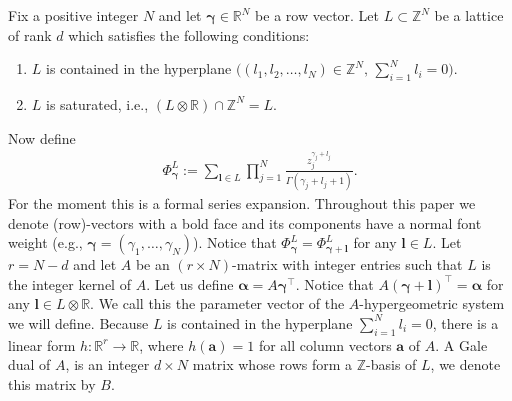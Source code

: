 \documentclass[11pt]{article}
\numberwithin{equation}{section}
\numberwithin{equation}{section}
\begin{document}
Fix a positive integer $N$ and let $\bm{\gamma}\in\mathbb{R}^N$ be a row vector. Let $L\subset\mathbb{Z}^N$ be a lattice of
rank $d$ which satisfies the following conditions:
\begin{enumerate}\itemsep=0pt
\item $L$ is contained in the hyperplane $\big((l_1,l_2,\dots,l_N) \in \mathbb{Z}^N, \, \sum_{i=1}^Nl_i=0\big)$.
\item $L$ is saturated, i.e., $(L\otimes\mathbb{R})\cap\mathbb{Z}^N=L$.
\end{enumerate}
Now define
\begin{gather*}
\Phi_{\bm{\gamma}}^L:=\sum_{\bm{l}\in L}\prod_{j=1}^N\frac{z_j^{\gamma_j+l_j}}
{\Gamma(\gamma_j+l_j+1)}.
\end{gather*}
For the moment this is a formal series expansion. Throughout this paper we denote (row)-vectors with a bold face and its components have a normal font weight (e.g., $\bm{\gamma} = (\gamma_1,\dots,\gamma_N )$).
Notice that $\Phi_{\bm{\gamma}}^L
=\Phi_{\bm{\gamma}+\bm{l}}^L$ for any $\bm{l}\in L$.
Let $r = N-d$ and let $A$ be an $(r \times N)$-matrix with integer entries such that $L$ is
the integer kernel of $A$.
Let us define
$\bm{\alpha}=A\bm{\gamma}^\intercal$. Notice that $A(\bm{\gamma}+\bm{l})^\intercal
=\bm{\alpha}$ for any $\bm{l}\in L\otimes\mathbb{R}$.
We call this the parameter vector of the $A$-hypergeometric system we will define.
Because $L$ is contained in the hyperplane $\sum_{i=1}^Nl_i=0$, there is a linear form $h\colon \mathbb{R}^{r} \rightarrow \mathbb{R}$, where $h(\bm{a}) = 1$ for all column vectors $\bm{a}$ of $A$. A Gale dual of $A$, is an integer $d\times N$ matrix whose rows form a
$\mathbb{Z}$-basis of $L$, we denote this matrix by $B$.
\end{document}
